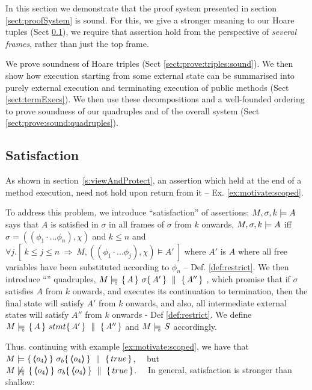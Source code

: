 

In this section we demonstrate that the proof system presented in section \ref{sect:proofSystem} is sound. 
For this, we give a stronger meaning to our Hoare tuples  (Sect \ref{s:scoped:valid}), we require  that   assertion hold from the perspective of \emph{several frames}, rather than just the top frame.

We prove soundness  of Hoare triples (Sect \ref{sect:prove:triples:sound}).
We then show how execution starting from some external state can be summarised into purely external execution and terminating execution of public methods (Sect \ref{sect:termExecs}). We then use these decompositions and a well-founded ordering to prove soundness of our quadruples  and of the overall system (Sect \ref{sect:prove:sound:quadruples}).


\subsection{\Scoped Satisfaction} 
\label{s:scoped:valid}


As shown in section~\ref{s:viewAndProtect}, an assertion which held at the end of a method execution, need not hold upon return from it -- \cf Ex. \ref{ex:motivate:scoped}.  
 


 

To address this problem, we introduce ``\scoped satisfaction'' of assertions: $ M,\sigma ,{k} \models {A} $   says that $A$ is satisfied in $\sigma$  in all frames of $\sigma$ from $k$ onwards, 
\ie  $ M,\sigma ,{k} \models {A} $ iff $\sigma = ((\phi_1\cdot ... \phi_n), \chi)$ and $k\leq n$ and $\forall j. [\  k\leq j \leq n \ \Rightarrow \ M, ((\phi_1\cdot ... \phi_j), \chi) \models A'\ ]$ where $A'$ is $A$ where all free variables have been substituted according to $\phi_n$ -- \cf Def. \ref{def:restrict}.
We then introduce ``\scoped'' quadruples,   $M \models\!\!\!\!_{_{\circ}}\   \{\, A \, \}\ \sigma \{\, A' \, \} \, \,\parallel\,\, \{\, A'' \, \} $ , which promise that if $\sigma$ satisfies $A$ from $k$ onwards, and executes its continuation to termination, then the final state will satisfy $A'$ from $k$ onwards, and also, all intermediate external states will satisfy $A''$ from $k$ onwards - \cf Def \ref{def:restrict}.
We define   $M \models\!\!\!\!_{_{\circ}}\   \{\, A \, \}\ stmt \{\, A' \, \} \, \,\parallel\,\, \{\, A'' \, \}  $ and  $M \models\!\!\!\!_{_{\circ}}\  S $ accordingly.


Thus. continuing with example \ref{ex:motivate:scoped},  we have that\ \  $\satisfies {M} {\quadruple   {\inside {o_4}} }   {\sigma_b}   {\inside {o_4}}  {true} $, \ \ 
 but \\ $\notSatisfiesD {M}   {\quadruple   {\inside {o_4}} }  {\sigma_b}   {\inside {o_4}}  {true}  $.
\ \  In general, \scoped satisfaction is stronger than shallow:   
 
